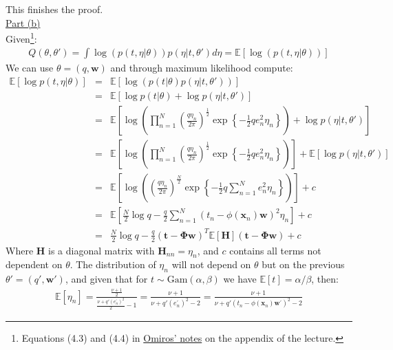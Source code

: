 \documentclass[a4paper, 11pt]{article}
\begin{document}
This finishes the proof.\\
\newline \underline{Part (b)}\\
\newline Given\footnote{Equations (4.3) and (4.4) in \href{http://www.econ.upf.edu/~omiros/notes2005.pdf}{Omiros' notes} on the appendix of the lecture.}:
\begin{eqnarray}
Q(\theta, \theta') = \int \log \left( p(t, \eta | \theta) \right) p(\eta | t, \theta') d\eta = \mathbb{E}\left[ \log \left( p(t, \eta | \theta) \right) \right] \nonumber
\end{eqnarray}
We can use $\theta = (q, \mathbf{w})$ and through maximum likelihood compute:
\begin{eqnarray}
\mathbb{E}\left[ \log p(t, \eta | \theta) \right] &=& \mathbb{E}\left[ \log \left( p(t | \theta) p(\eta | t, \theta') \right) \right] \nonumber \\
&=& \mathbb{E}\left[ \log p(t | \theta) +\log p(\eta | t, \theta') \right] \nonumber \\
&=& \mathbb{E}\left[ \log \left( \prod_{n=1}^{N} \left( \frac{q \eta_n}{2 \pi} \right)^{\frac{1}{2}} \exp \left\{ -\frac{1}{2} q e_n^2 \eta_n \right\}  \right) +\log p(\eta | t, \theta') \right] \nonumber \\
&=& \mathbb{E}\left[ \log \left( \prod_{n=1}^{N} \left( \frac{q \eta_n}{2 \pi} \right)^{\frac{1}{2}} \exp \left\{ -\frac{1}{2} q e_n^2 \eta_n \right\}  \right)  \right] + \mathbb{E}\left[ \log p(\eta | t, \theta') \right] \nonumber \\
&=& \mathbb{E}\left[ \log \left( \left( \frac{q \eta_n}{2 \pi} \right)^{\frac{N}{2}} \exp \left\{ -\frac{1}{2} q \sum_{n=1}^{N} e_n^2 \eta_n \right\}  \right) \right] + c \nonumber \\
&=& \mathbb{E}\left[ \frac{N}{2} \log q - \frac{q}{2} \sum_{n=1}^{N} (t_n - \phi(\mathbf{x}_n) \mathbf{w})^2 \eta_n \right] + c \nonumber \\
&=& \frac{N}{2} \log q - \frac{q}{2} (\mathbf{t} - \mathbf{\Phi} \mathbf{w})^T \mathbb{E}\left[ \mathbf{H} \right] (\mathbf{t} - \mathbf{\Phi} \mathbf{w}) + c \nonumber
\end{eqnarray}
Where $\mathbf{H}$ is a diagonal matrix with $\mathbf{H}_{nn} = \eta_n$, and $c$ contains all terms not dependent on $\theta$. The distribution of $\eta_n$ will not depend on $\theta$ but on the previous $\theta' = (q', \mathbf{w}')$, and given that for $t \sim \text{Gam}(\alpha, \beta)$ we have $\mathbb{E}[t] = \alpha / \beta$, then:
\begin{eqnarray}
\mathbb{E}[\eta_n] = \frac{\frac{\nu + 1}{2}}{ \frac{\nu + q' (e_{n}^{'})^2}{2} - 1} = \frac{\nu + 1}{\nu + q' (e_{n}^{'})^2 - 2} = \frac{\nu + 1}{\nu + q' (t_n - \phi(\mathbf{x}_{n}) \mathbf{w}^{'})^2 - 2} \nonumber
\end{eqnarray}
\end{document}
